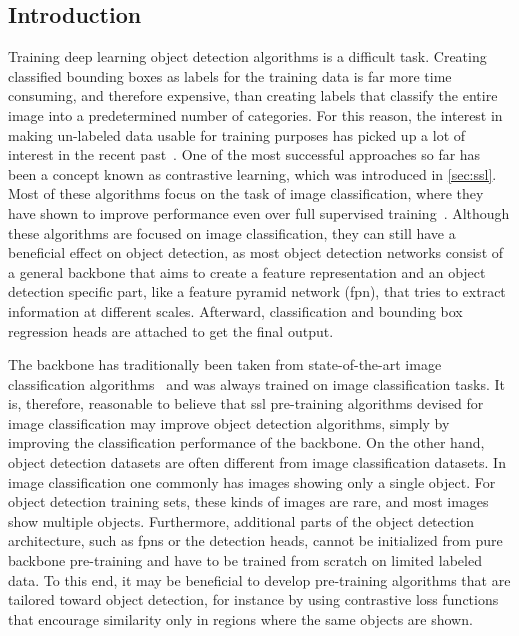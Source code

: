 \subsection{Introduction}
Training deep learning object detection algorithms is a difficult task. Creating classified bounding boxes as labels for the training data is far more time consuming, and therefore expensive, than creating labels that classify the entire image into a predetermined number of categories. For this reason, the interest in making un-labeled data usable for training purposes has picked up a lot of interest in the recent past~\cite{Chen:2020aab, Grill:2020aaa, Chen:2020aaa}. One of the most successful approaches so far has been a concept known as contrastive learning, which was introduced in \ref{sec:ssl}. Most of these algorithms focus on the task of image classification, where they have shown to improve performance even over full supervised training~\cite{Chen:2020aaa}. Although these algorithms are focused on image classification, they can still have a beneficial effect on object detection, as most object detection networks consist of a general backbone that aims to create a feature representation and an object detection specific part, like a feature pyramid network (\acrshort{fpn}), that tries to extract information at different scales. Afterward, classification and bounding box regression heads are attached to get the final output.

The backbone has traditionally been taken from state-of-the-art image classification algorithms~\cite{Chen:2020aab, Grill:2020aaa, Chen:2020aaa} and was always trained on image classification tasks. It is, therefore, reasonable to believe that \acrshort{ssl} pre-training algorithms devised for image classification may improve object detection algorithms, simply by improving the classification performance of the backbone.
On the other hand, object detection datasets are often different from image classification datasets. In image classification one commonly has images showing only a single object. For object detection training sets, these kinds of images are rare, and most images show multiple objects. Furthermore, additional parts of the object detection architecture, such as \acrshort{fpn}s or the detection heads, cannot be initialized from pure backbone pre-training and have to be trained from scratch on limited labeled data. To this end, it may be beneficial to develop pre-training algorithms that are tailored toward object detection, for instance by using contrastive loss functions that encourage similarity only in regions where the same objects are shown.

